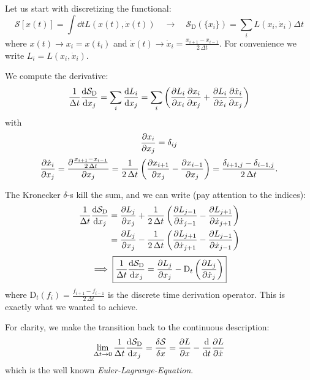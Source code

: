 \documentclass[11pt,a4paper]{scrartcl}
\newcommand{\SD}{\ensuremath{\mathcal{S}_{\mathrm{D}}}}
\newcommand{\xdoti}{\ensuremath{\dot{x}_i}}
\newcommand{\xdotj}{\ensuremath{\dot{x}_j}}
\newcommand{\xdotjm}{\ensuremath{\dot{x}_{j-1}}}
\newcommand{\deltaij}{\ensuremath{\delta_{ij}}}
\newcommand{\OverDeltaT}[1]{\ensuremath{\frac{#1}{\Delta t}}}
\newcommand{\DT}{\ensuremath{\mathrm{D}_t}}
\newcommand{\OverTwoDeltaT}[1]{\ensuremath{\frac{#1}{2\, \Delta t}}}
\newcommand{\xdotjp}{\ensuremath{\dot{x}_{j+1}}}
\begin{document}
Let us start with discretizing the functional:
\begin{equation}
    \mathcal{S}\left[x(t)\right] = \int\dd{t}L\left(x(t), \dot{x}(t)\right)
    \quad\longrightarrow\quad
    \SD\left(\{x_i\}\right) = \sum_i L\left(x_i, \xdoti\right)\Delta t
\end{equation}
where $x(t) \longrightarrow x_i = x(t_i)$ and $\dot{x}(t) \longrightarrow
\xdoti = \OverTwoDeltaT{x_{i+1}-x_{i-1}}$. For convenience we write $L_i = L(x_i, \xdoti)$.

We compute the derivative:
\begin{equation}
    \OverDeltaT{1}\dv{\SD}{x_j} =\sum_i\dv{L_i}{x_j}
    =\sum_i\left(\pdv{L_i}{x_i}\pdv{x_i}{x_j}+\pdv{L_i}{\xdoti}\pdv{\xdoti}{x_j}\right)
\end{equation}
with
\begin{subequations}
\begin{gather}
    \pdv{x_i}{x_j}=\deltaij \\
    \pdv{\xdoti}{x_j}=\pdv{\OverTwoDeltaT{x_{i+1}-x_{i-1}}}{x_j}
    =\OverTwoDeltaT{1}\left(\pdv{x_{i+1}}{x_j}-\pdv{x_{i-1}}{x_j}\right)
    =\frac{\delta_{i+1,j}-\delta_{i-1,j}}{2\,\Delta t}.
\end{gather}
\end{subequations}

The Kronecker $\delta$-s kill the sum, and we can write (pay attention to the indices):
\begin{align*}
    \OverDeltaT{1}\dv{\SD}{x_j}&=\pdv{L_j}{x_j}+\frac{1}{2\,\Delta{t}}
    \left(\pdv{L_{j-1}}{\xdotjm}-\pdv{L_{j+1}}{\xdotjp}\right)
    \\
    &=\pdv{L_j}{x_j}-\OverTwoDeltaT{1}\left(\pdv{L_{j+1}}{\xdotjp}-\pdv{L_{j-1}}{\xdotjm}\right)
\end{align*}
\begin{equation}
    \implies\boxed{\OverDeltaT{1}\dv{\SD}{x_j}=\pdv{L_j}{x_j}-\DT\left(\pdv{L_{j}}{\xdotj}\right)}
    \label{eq:DiscreteActionDerivative}
\end{equation}
where $\DT(f_i)=\OverTwoDeltaT{f_{i+1}-f_{i-1}}$ is the discrete time derivation
operator.
This is exactly what we wanted to achieve.

For clarity, we make the transition back to the continuous description:
\begin{equation}
    \lim_{\Delta{t}\to0}\OverDeltaT{1}\dv{\SD}{x_j}
    =\fdv{\mathcal{S}}{x}=\pdv{L}{x}-\dv{t}\pdv{L}{\dot{x}}
\end{equation}
which is the well known \emph{Euler-Lagrange-Equation}.
\end{document}
